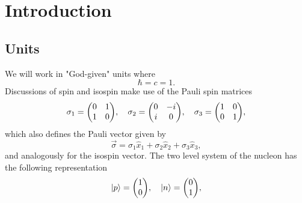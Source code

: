 \chapter{Introduction}
\lipsum[1-2]
\section{Units}
We will work in "God-given" units where
\begin{equation}
    \hbar = c = 1.
\end{equation}
Discussions of spin and isospin make use of the Pauli spin matrices
\begin{equation}
    \sigma_1 = \mqty(0 & 1\\ 1 & 0), \quad \sigma_2 = \mqty(0 & -i\\ i & 0), \quad \sigma_3 = \mqty(1 & 0\\ 0 & 1),
\end{equation}
which also defines the Pauli vector given by
\begin{equation}
    \Vec{\sigma} = \sigma_1 \hat{x}_1+\sigma_2 \hat{x}_2+\sigma_3\hat{x}_3,
\end{equation}
and analogously for the isospin vector. The two level system of the nucleon has the following representation
\begin{equation}
    \ket{p} = \mqty(1 \\ 0), \quad  \ket{n} = \mqty(0 \\ 1),
\end{equation}